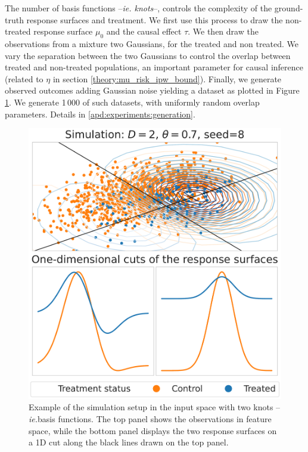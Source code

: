 \documentclass[french,12pt,twoside,a4paper]{book}
\begin{document}
The number of basis functions --\emph{ie. knots}--, controls the complexity of
the ground-truth response surfaces and treatment. We first use this process to
draw the non-treated response surface $\mu_0$ and the causal effect $\tau$. We
then draw the observations from a mixture two Gaussians, for the treated and non
treated. We vary the separation between the two Gaussians to control the
overlap between treated and non-treated populations, an important parameter
for causal inference (related to $\eta$ in section
\ref{theory:mu_risk_ipw_bound}). Finally, we generate observed outcomes
adding Gaussian noise yielding a dataset as plotted in Figure \ref{fig:simulation_examples}. We generate 1\,000 of such datasets, with
uniformly random overlap parameters. Details in
\ref{apd:experiments:generation}.

%

\begin{figure}[b!]
  \begin{minipage}{0.3\textwidth}
    \caption{Example of the simulation setup in the input space with two
      knots --\emph{ie.}basis functions. The top panel
      shows the observations in feature space, while the bottom panel displays the
      two response surfaces on a 1D cut along the black lines drawn on
      the top panel.}
    \label{fig:simulation_examples}
  \end{minipage}
  \hfill
  \begin{minipage}{0.65\textwidth}
    \centering
    \includegraphics[width=0.8\linewidth]{img/chapter_5/caussim_example_rs_gaussian=8_rs_rotation=8_ntv=0.37_D=2_overlap=0.7_p_A=0.1.pdf}
  \end{minipage}
\end{figure}
\end{document}
